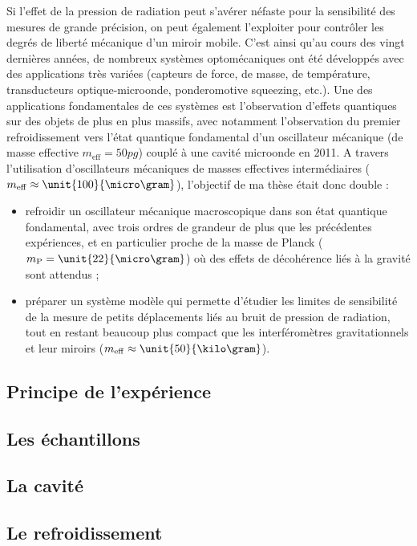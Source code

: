 \documentclass[12pt,a4paper]{article}
\begin{document}
Si l'effet de la pression de radiation peut s'avérer néfaste pour la sensibilité des mesures de grande précision, on peut également l'exploiter pour contrôler les degrés de liberté mécanique d'un miroir mobile.
C'est ainsi qu'au cours des vingt dernières années, de nombreux systèmes optomécaniques ont été développés avec des applications très variées (capteurs de force, de masse, de température, transducteurs optique-microonde, ponderomotive squeezing, etc.).
Une des applications fondamentales de ces systèmes est l'observation d'effets quantiques sur des objets de plus en plus massifs, avec notamment l'observation du premier refroidissement vers l'état quantique fondamental d'un oscillateur mécanique (de masse effective $m_\mathrm{eff} = \unit{50}{pg}$) couplé à une cavité microonde en 2011.
A travers l'utilisation d'oscillateurs mécaniques de masses effectives intermédiaires ($m_\mathrm{eff} \approx \unit{100}{\micro\gram}$), l'objectif de ma thèse était donc double :
\begin{itemize}
\item refroidir un oscillateur mécanique macroscopique dans son état quantique fondamental, avec trois ordres de grandeur de plus que les précédentes expériences, et en particulier proche de la masse de Planck ($m_\mathrm{P}=\unit{22}{\micro\gram}$) où des effets de décohérence liés à la gravité sont attendus ;
\item préparer un système modèle qui permette d'étudier les limites de sensibilité de la mesure de petits déplacements liés au bruit de pression de radiation, tout en restant beaucoup plus compact que les interféromètres gravitationnels et leur miroirs ($m_\mathrm{eff}\approx\unit{50}{\kilo\gram}$).
\end{itemize}

\subsection{Principe de l'expérience}

\subsection{Les échantillons}

\subsection{La cavité}

\subsection{Le refroidissement}
\end{document}
